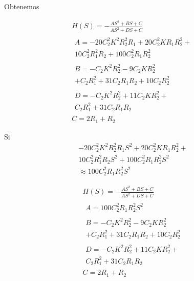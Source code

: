 \documentclass[../../tc_tp3_main.tex]{subfiles}
\begin{document}
Obtenemos


\begin{gather}
H(S)=-\frac{AS^2+BS+C}{AS^2+DS+C}\\
\begin{split}
A=-20C_{2}^2 K^2 R_{2}^2 R_{1}   +    20 C_{2}^{2} K R_{1} R_{2}^2 + \\ 10 C_{2}^2 R_{1}^2 R_{2} +  100 C_{2}^{2} R_{1} R_{2}^2  
\end{split}\\
\begin{split}
B= -C_2K^2 R_2^2 -9 C_2 K R_2^2  \\+ C_2 R_1^2  + 31 C_2 R_1 R_2  + 10 C_2 R_2^2  
\end{split}\\
\begin{split}
D=-C_2 K^2 R_2^2+11C_2K R_2^2 +\\ C_2 R_1^2+31 C_2 R_1 R_2
\end{split}\\
C=2R_1+R_2
\end{gather}





Si
\begin{equation}
\begin{split}
-20C_{2}^2 K^2 R_{2}^2 R_{1}  S^{2} +    20 C_{2}^{2} K R_{1} R_{2}^2+\\ 10 C_{2}^2 R_{1}^2 R_{2} S^{2} + 100 C_{2}^{2} R_{1} R_{2}^2 S^{2}  \\   \approx 100 C_{2}^2 R_{1} R_{2} ^2 S^2
\end{split}
\end{equation}

\begin{gather}
H(S)=-\frac{AS^2+BS+C}{AS^2+DS+C} \label{eq:MfinalR}\\
\begin{split}
A=100 C_{2}^2 R_{1} R_{2} ^2 S^2
\end{split}\\
\begin{split}
B= -C_2K^2 R_2^2 -9 C_2 K R_2^2  \\+ C_2 R_1^2  + 31 C_2 R_1 R_2  + 10 C_2 R_2^2  
\end{split}\\
\begin{split}
D=-C_2 K^2 R_2^2+11C_2K R_2^2 + \\ C_2 R_1^2+31 C_2 R_1 R_2
\end{split}\\
C=2R_1+R_2
\end{gather}
\end{document}
